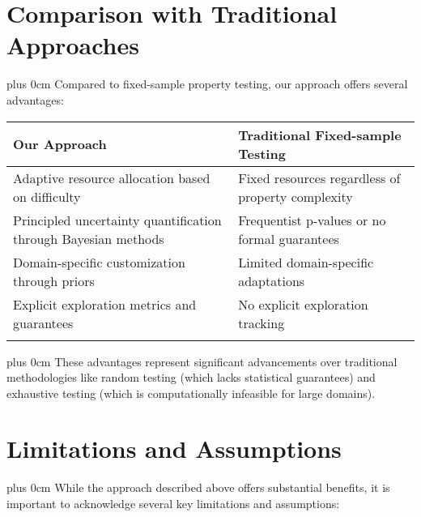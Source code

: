 \documentclass[11pt,a4paper]{article}
\newcommand{\justifytext}{\leftskip=0pt \rightskip=0pt plus 0cm}
\newcommand{\tabletitlecolor}{blue!70!black}
\newcommand{\tableheader}[1]{\cellcolor{tablerow1}\textbf{\large #1}}
\begin{document}
\section{Comparison with Traditional Approaches}

\justifytext
Compared to fixed-sample property testing, our approach offers several advantages:

\begin{tcolorbox}[
  enhanced,
  colback=white,
  colframe=\tabletitlecolor,
  arc=0mm,
  boxrule=0.5pt,
  left=0pt,
  right=0pt,
  top=2pt,
  bottom=2pt,
  boxsep=0pt,
  width=\textwidth
]
\vspace{1mm}
\begin{tabularx}{\textwidth}{>{\raggedright\arraybackslash}X|>{\raggedright\arraybackslash}X}
\tableheader{Our Approach} & \tableheader{Traditional Fixed-sample Testing} \\
\hline
\addlinespace[3pt]
Adaptive resource allocation based on difficulty & 
Fixed resources regardless of property complexity \\
\addlinespace[3pt]
\hline
\addlinespace[3pt]

Principled uncertainty quantification through Bayesian methods & 
Frequentist p-values or no formal guarantees \\
\addlinespace[3pt]
\hline
\addlinespace[3pt]

Domain-specific customization through priors & 
Limited domain-specific adaptations \\
\addlinespace[3pt]
\hline
\addlinespace[3pt]

Explicit exploration metrics and guarantees & 
No explicit exploration tracking \\
\addlinespace[3pt]
\end{tabularx}
\vspace{1mm}
\end{tcolorbox}

\justifytext
These advantages represent significant advancements over traditional methodologies like random testing (which lacks statistical guarantees) and exhaustive testing (which is computationally infeasible for large domains).

\section{Limitations and Assumptions}

\justifytext
While the approach described above offers substantial benefits, it is important to acknowledge several key limitations and assumptions:
\end{document}
